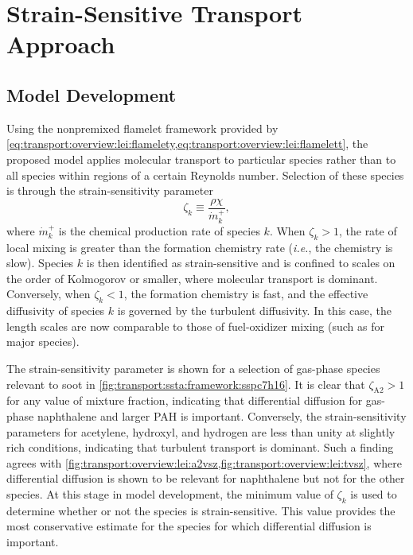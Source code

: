 \section{Strain-Sensitive Transport Approach}
\label{sec:transport:ssta}

\subsection{Model Development}
\label{sec:transport:ssta:framework}

Using the nonpremixed flamelet framework provided by \cref{eq:transport:overview:lei:flamelety,eq:transport:overview:lei:flamelett}, the proposed model applies molecular transport to particular species rather than to all species within regions of a certain Reynolds number. Selection of these species is through the strain-sensitivity parameter
\begin{equation}\label{eq:transport:ssta:framework:ssp}
  \zeta_k \equiv \frac{\rho\chi}{\dot{m}_k^{+}},
\end{equation}
where $\dot{m}_k^{+}$ is the chemical production rate of species $k$. When $\zeta_k > 1$, the rate of local mixing is greater than the formation chemistry rate (\textit{i.e.}, the chemistry is slow). Species $k$ is then identified as strain-sensitive and is confined to scales on the order of Kolmogorov or smaller, where molecular transport is dominant. Conversely, when $\zeta_k < 1$, the formation chemistry is fast, and the effective diffusivity of species $k$ is governed by the turbulent diffusivity. In this case, the length scales are now comparable to those of fuel-oxidizer mixing (such as for major species).

The strain-sensitivity parameter is shown for a selection of gas-phase species relevant to soot in \cref{fig:transport:ssta:framework:sspc7h16}. It is clear that $\zeta_{\text{A2}} > 1$ for any value of mixture fraction, indicating that differential diffusion for gas-phase naphthalene and larger PAH is important. Conversely, the strain-sensitivity parameters for acetylene, hydroxyl, and hydrogen are less than unity at slightly rich conditions, indicating that turbulent transport is dominant. Such a finding agrees with \cref{fig:transport:overview:lei:a2vsz,fig:transport:overview:lei:tvsz}, where differential diffusion is shown to be relevant for naphthalene but not for the other species. At this stage in model development, the minimum value of $\zeta_k$ is used to determine whether or not the species is strain-sensitive. This value provides the most conservative estimate for the species for which differential diffusion is important.

